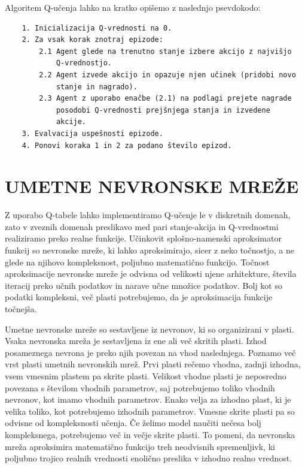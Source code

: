 \documentclass[cover]{thesis}
\begin{document}
Algoritem Q-učenja lahko na kratko opišemo z naslednjo psevdokodo:
\begin{verbatim}        
    1. Inicializacija Q-vrednosti na 0.
    2. Za vsak korak znotraj epizode:
        2.1 Agent glede na trenutno stanje izbere akcijo z najvišjo
            Q-vrednostjo.
        2.2 Agent izvede akcijo in opazuje njen učinek (pridobi novo
            stanje in nagrado).
        2.3 Agent z uporabo enačbe (2.1) na podlagi prejete nagrade
            posodobi Q-vrednosti prejšnjega stanja in izvedene
            akcije.
    3. Evalvacija uspešnosti epizode.
    4. Ponovi koraka 1 in 2 za podano število epizod.
\end{verbatim}

\section{UMETNE NEVRONSKE MREŽE}
Z uporabo Q-tabele lahko implementiramo Q-učenje le v diskretnih domenah, zato v zveznih domenah preslikavo med pari stanje-akcija in Q-vrednostmi realiziramo preko realne funkcije. Učinkovit splošno-namenski aproksimator funkcij so nevronske mreže, ki lahko aproksimirajo, sicer z neko točnostjo, a ne glede na njihovo kompleksnost, poljubno matematično funkcijo. Točnost aproksimacije nevronske mreže je odvisna od velikosti njene arhitekture, števila iteracij preko učnih podatkov in narave učne množice podatkov. Bolj kot so podatki kompleksni, več plasti potrebujemo, da je aproksimacija funkcije točnejša.

Umetne nevronske mreže so sestavljene iz nevronov, ki so organizirani v plasti. Vsaka nevronska mreža je sestavljena iz ene ali več skritih plasti. Izhod posameznega nevrona je preko njih povezan na vhod naslednjega. Poznamo več vrst plasti umetnih nevronskih mrež. Prvi plasti rečemo vhodna, zadnji izhodna, vsem vmesnim plastem pa skrite plasti. Velikost vhodne plasti je neposredno povezana s številom vhodnih parametrov, saj potrebujemo toliko vhodnih nevronov, kot imamo vhodnih parametrov. Enako velja za izhodno plast, ki je velika toliko, kot potrebujemo izhodnih parametrov. Vmesne skrite plasti pa so odvisne od kompleksnosti učenja. Če želimo model naučiti nečesa bolj kompleksnega, potrebujemo več in večje skrite plasti. To pomeni, da nevronska mreža aproksimira matematično funkcijo treh neodvisnih spremenljivk, ki poljubno trojico realnih vrednosti enolično preslika v izhodno realno vrednost.
\end{document}
